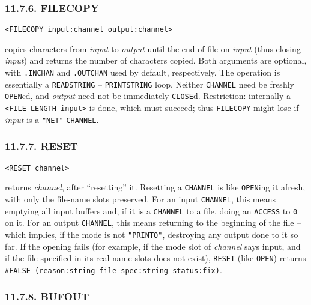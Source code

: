 \documentclass[a4paper,]{article}
\begin{document}
\subsubsection{11.7.6. FILECOPY}\label{filecopy}

\begin{verbatim}
<FILECOPY input:channel output:channel>
\end{verbatim}

 copies characters from \emph{input} to \emph{output} until the end of file on \emph{input}
(thus closing \emph{input}) and returns the number of characters copied. Both arguments are optional, with \texttt{.INCHAN}
and \texttt{.OUTCHAN} used by default, respectively. The operation is essentially a \texttt{READSTRING} --
\texttt{PRINTSTRING} loop. Neither \texttt{CHANNEL} need be freshly \texttt{OPEN}ed, and \emph{output} need not be
immediately \texttt{CLOSE}d. Restriction: internally a \texttt{\textless{}FILE-LENGTH\ input\textgreater{}} is done, which
must succeed; thus \texttt{FILECOPY} might lose if \emph{input} is a \texttt{"NET"} \texttt{CHANNEL}.

\subsubsection{11.7.7. RESET}\label{reset}

\begin{verbatim}
<RESET channel>
\end{verbatim}

 returns \emph{channel}, after ``resetting'' it. Resetting a \texttt{CHANNEL} is like
\texttt{OPEN}ing  it afresh, with only the file-name slots preserved. For an input \texttt{CHANNEL},
this means emptying all input buffers and, if it is a \texttt{CHANNEL} to a file, doing an \texttt{ACCESS} to \texttt{0} on
it. For an output \texttt{CHANNEL}, this means returning to the beginning of the file -- which implies, if the mode is not
\texttt{"PRINTO"}, destroying any output done to it so far. If the opening fails (for example, if the mode slot of
\emph{channel} says input, and if the file specified in its real-name slots does not exist), \texttt{RESET} (like
\texttt{OPEN}) returns \texttt{\#FALSE\ (reason:string\ file-spec:string\ status:fix)}.

\subsubsection{11.7.8. BUFOUT}\label{bufout}
\end{document}
